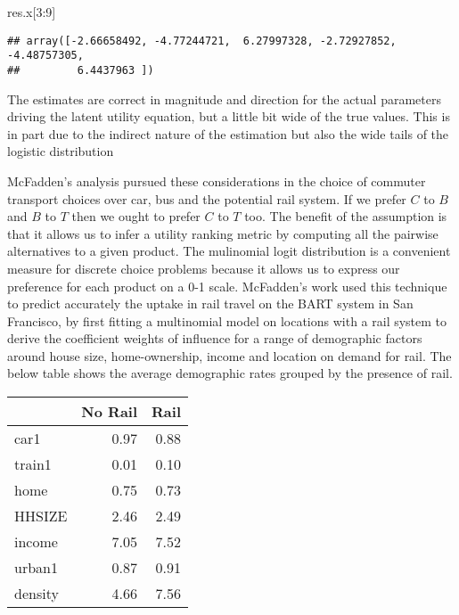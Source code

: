 \documentclass[]{tufte-book}
\newenvironment{Shaded}{}{}
\newcommand{\DecValTok}[1]{\textcolor[rgb]{0.25,0.63,0.44}{#1}}
\newcommand{\NormalTok}[1]{#1}
\theoremstyle{definition}
\theoremstyle{definition}
\theoremstyle{definition}
\theoremstyle{remark}
\begin{document}
\begin{Shaded}
\begin{Highlighting}[]
\NormalTok{res.x[}\DecValTok{3}\NormalTok{:}\DecValTok{9}\NormalTok{]}
\end{Highlighting}
\end{Shaded}

\begin{verbatim}
## array([-2.66658492, -4.77244721,  6.27997328, -2.72927852, -4.48757305,
##         6.4437963 ])
\end{verbatim}

The estimates are correct in magnitude and direction for the actual parameters driving the latent utility equation, but a little bit wide of the true values. This is in part due to the indirect nature of the estimation but also the wide tails of the logistic distribution

McFadden's analysis pursued these considerations in the choice of commuter transport choices over car, bus and the potential rail system. If we prefer \(C\) to \(B\) and \(B\) to \(T\) then we ought to prefer \(C\) to \(T\) too. The benefit of the assumption is that it allows us to infer a utility ranking metric by computing all the pairwise alternatives to a given product. The mulinomial logit distribution is a convenient measure for discrete choice problems because it allows us to express our preference for each product on a 0-1 scale. McFadden's work used this technique to predict accurately the uptake in rail travel on the BART system in San Francisco, by first fitting a multinomial model on locations with a rail system to derive the coefficient weights of influence for a range of demographic factors around house size, home-ownership, income and location on demand for rail. The below table shows the average demographic rates grouped by the presence of rail.

\begin{tabular}{l|r|r}
\hline
  & No Rail & Rail\\
\hline
car1 & 0.97 & 0.88\\
\hline
train1 & 0.01 & 0.10\\
\hline
home & 0.75 & 0.73\\
\hline
HHSIZE & 2.46 & 2.49\\
\hline
income & 7.05 & 7.52\\
\hline
urban1 & 0.87 & 0.91\\
\hline
density & 4.66 & 7.56\\
\hline
\end{tabular}
\end{document}
